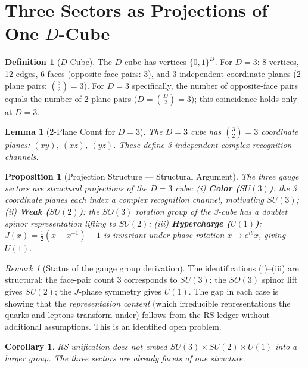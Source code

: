 \documentclass[12pt,a4paper]{article}
\newtheorem{lemma}[theorem]{Lemma}
\newtheorem{corollary}[theorem]{Corollary}
\newtheorem{proposition}[theorem]{Proposition}
\theoremstyle{definition}
\newtheorem{definition}[theorem]{Definition}
\theoremstyle{remark}
\newtheorem{remark}[theorem]{Remark}
\begin{document}
\section{Three Sectors as Projections of One $D$-Cube}
\label{sec:projections}

\begin{definition}[$D$-Cube]
The $D$-cube has vertices $\{0,1\}^D$.  For $D = 3$: 8 vertices, 12
edges, 6 faces (opposite-face pairs: 3), and 3 independent coordinate
planes (2-plane pairs: $\binom{3}{2} = 3$).  For $D = 3$ specifically,
the number of opposite-face pairs equals the number of 2-plane pairs
($D = \binom{D}{2} = 3$); this coincidence holds only at $D = 3$.
\end{definition}

\begin{lemma}[2-Plane Count for $D = 3$]
\label{lem:face-pairs}
The $D = 3$ cube has $\binom{3}{2} = 3$ coordinate planes:
$(xy)$, $(xz)$, $(yz)$.  These define 3 independent complex
recognition channels.
\end{lemma}

\begin{proposition}[Projection Structure --- Structural Argument]
\label{thm:projections}
The three gauge sectors are structural projections of the $D = 3$ cube:
(i) \textbf{Color ($SU(3)$)}: the 3 coordinate planes each index a
complex recognition channel, motivating $SU(3)$;
(ii) \textbf{Weak ($SU(2)$)}: the $SO(3)$ rotation group of the 3-cube
has a doublet spinor representation lifting to $SU(2)$;
(iii) \textbf{Hypercharge ($U(1)$)}: $J(x) = \tfrac{1}{2}(x + x^{-1}) - 1$
is invariant under phase rotation $x \mapsto e^{i\theta}x$, giving $U(1)$.
\end{proposition}

\begin{remark}[Status of the gauge group derivation]
\label{rem:gauge-status}
The identifications (i)--(iii) are structural: the face-pair count 3
corresponds to $SU(3)$; the $SO(3)$ spinor lift gives $SU(2)$; the
$J$-phase symmetry gives $U(1)$.  The gap in each case is showing that
the \emph{representation content} (which irreducible representations the
quarks and leptons transform under) follows from the RS ledger without
additional assumptions.  This is an identified open problem.
\end{remark}

\begin{corollary}
\label{cor:no-embedding}
RS unification does not embed $SU(3) \times SU(2) \times U(1)$
into a larger group.  The three sectors are already facets of
one structure.
\end{corollary}
\end{document}
